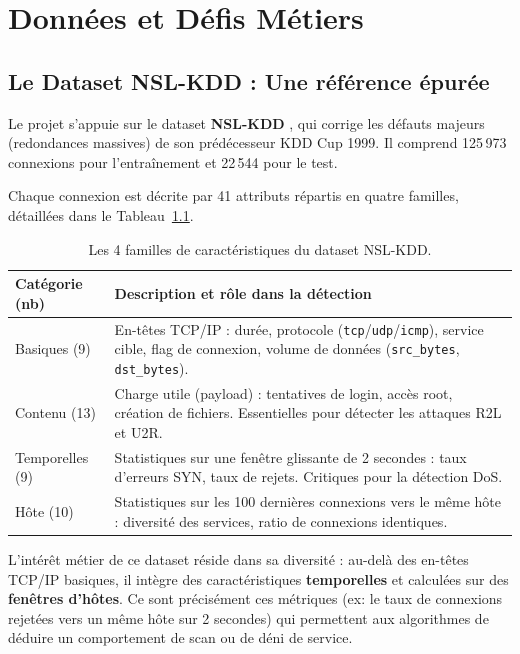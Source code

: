 \documentclass[12pt,a4paper]{report}
\begin{document}
\chapter{Données et Défis Métiers}

\section{Le Dataset NSL-KDD : Une référence épurée}

Le projet s'appuie sur le dataset \textbf{NSL-KDD} \cite{tavallaee2009}, qui corrige les défauts majeurs (redondances massives) de son prédécesseur KDD Cup 1999. Il comprend 125\,973 connexions pour l'entraînement et 22\,544 pour le test.

Chaque connexion est décrite par 41 attributs répartis en quatre familles, détaillées dans le Tableau~\ref{tab:features}.

\begin{table}[H]
    \centering
    \begin{tabularx}{\textwidth}{lX}
        \toprule
        \textbf{Catégorie (nb)} & \textbf{Description et rôle dans la détection} \\
        \midrule
        Basiques (9) & En-têtes TCP/IP : durée, protocole (\texttt{tcp}/\texttt{udp}/\texttt{icmp}), service cible, flag de connexion, volume de données (\texttt{src\_bytes}, \texttt{dst\_bytes}). \\
        \addlinespace
        Contenu (13) & Charge utile (payload) : tentatives de login, accès root, création de fichiers. Essentielles pour détecter les attaques R2L et U2R. \\
        \addlinespace
        Temporelles (9) & Statistiques sur une fenêtre glissante de 2 secondes : taux d'erreurs SYN, taux de rejets. Critiques pour la détection DoS. \\
        \addlinespace
        Hôte (10) & Statistiques sur les 100 dernières connexions vers le même hôte : diversité des services, ratio de connexions identiques. \\
        \bottomrule
    \end{tabularx}
    \caption{Les 4 familles de caractéristiques du dataset NSL-KDD.}
    \label{tab:features}
\end{table}

L'intérêt métier de ce dataset réside dans sa diversité : au-delà des en-têtes TCP/IP basiques, il intègre des caractéristiques \textbf{temporelles} et calculées sur des \textbf{fenêtres d'hôtes}. Ce sont précisément ces métriques (ex: le taux de connexions rejetées vers un même hôte sur 2 secondes) qui permettent aux algorithmes de déduire un comportement de scan ou de déni de service.
\end{document}
